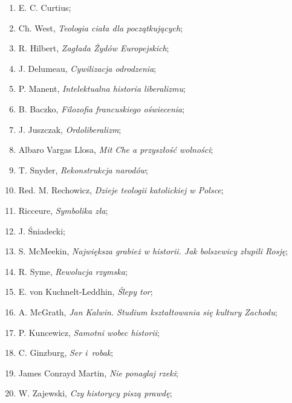 \documentclass[a4paper,11pt]{article}
\begin{document}
\begin{enumerate}
\item E. C. Curtius;

\item Ch. West, \emph{Teologia ciała dla początkujących};

\item R. Hilbert, \emph{Zagłada Żydów Europejskich};

\item J. Delumeau, \emph{Cywilizacja odrodzenia};

\item P. Manent, \emph{Intelektualna historia liberalizmu};

\item B. Baczko, \emph{Filozofia francuskiego oświecenia};

\item J. Juszczak, \emph{Ordoliberalizm};

\item Albaro Vargas Llosa, \emph{Mit Che a przyszłość wolności};

\item T. Snyder, \emph{Rekonstrukcja narodów};

\item Red. M. Rechowicz, \emph{Dzieje teologii katolickiej w Polsce};

\item Ricceure, \emph{Symbolika zła};

\item J. Śniadecki;

\item S. McMeekin, \emph{Największa grabież w historii. Jak bolszewicy
    złupili Rosję};

\item R. Syme, \emph{Rewolucja rzymska};

\item E. von Kuchnelt-Leddhin, \emph{Ślepy tor};

\item A. McGrath, \emph{Jan Kalwin. Studium kształtowania się kultury
    Zachodu};

\item P. Kuncewicz, \emph{Samotni wobec historii};

\item C. Ginzburg, \emph{Ser i~robak};

\item James Conrayd Martin, \emph{Nie ponaglaj rzeki};

\item W. Zajewski, \emph{Czy historycy piszą prawdę};


\end{enumerate}
\end{document}
